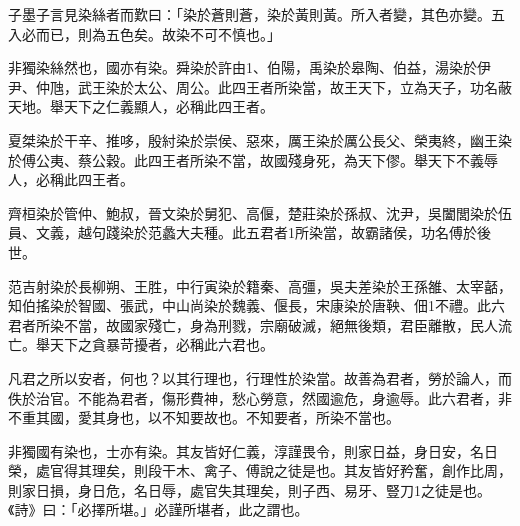 
\begin{pinyinscope}
子墨子言見染絲者而歎曰：「染於蒼則蒼，染於黃則黃。所入者變，其色亦變。五入必而已，則為五色矣。故染不可不慎也。」

非獨染絲然也，國亦有染。舜染於許由1、伯陽，禹染於皋陶、伯益，湯染於伊尹、仲虺，武王染於太公、周公。此四王者所染當，故王天下，立為天子，功名蔽天地。舉天下之仁義顯人，必稱此四王者。

夏桀染於干辛、推哆，殷紂染於崇侯、惡來，厲王染於厲公長父、榮夷終，幽王染於傅公夷、蔡公穀。此四王者所染不當，故國殘身死，為天下僇。舉天下不義辱人，必稱此四王者。

齊桓染於管仲、鮑叔，晉文染於舅犯、高偃，楚莊染於孫叔、沈尹，吳闔閭染於伍員、文義，越句踐染於范蠡大夫種。此五君者1所染當，故霸諸侯，功名傅於後世。

范吉射染於長柳朔、王胜，中行寅染於籍秦、高彊，吳夫差染於王孫雒、太宰嚭，知伯搖染於智國、張武，中山尚染於魏義、偃長，宋康染於唐鞅、佃1不禮。此六君者所染不當，故國家殘亡，身為刑戮，宗廟破滅，絕無後類，君臣離散，民人流亡。舉天下之貪暴苛擾者，必稱此六君也。

凡君之所以安者，何也？以其行理也，行理性於染當。故善為君者，勞於論人，而佚於治官。不能為君者，傷形費神，愁心勞意，然國逾危，身逾辱。此六君者，非不重其國，愛其身也，以不知要故也。不知要者，所染不當也。

非獨國有染也，士亦有染。其友皆好仁義，淳謹畏令，則家日益，身日安，名日榮，處官得其理矣，則段干木、禽子、傅說之徒是也。其友皆好矜奮，創作比周，則家日損，身日危，名日辱，處官失其理矣，則子西、易牙、豎刀1之徒是也。《詩》曰：「必擇所堪。」必謹所堪者，此之謂也。


\end{pinyinscope}